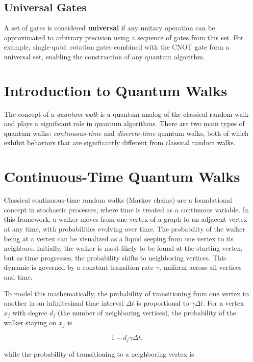 \documentclass[11pt]{article}
\theoremstyle{definition}
\begin{document}
\subsection*{Universal Gates}
A set of gates is considered \textbf{universal} if any unitary operation can be approximated to arbitrary precision using a sequence of gates from this set. For example, single-qubit rotation gates combined with the CNOT gate form a universal set, enabling the construction of any quantum algorithm.

\section{Introduction to Quantum Walks}


The concept of a \textit{quantum walk} is a quantum analog of the classical random walk and plays a significant role in quantum algorithms. There are two main types of quantum walks: \textit{continuous-time} and \textit{discrete-time} quantum walks, both of which exhibit behaviors that are significantly different from classical random walks.

\section*{Continuous-Time Quantum Walks}


Classical continuous-time random walks (Markov chains) are a foundational concept in stochastic processes, where time is treated as a continuous variable. In this framework, a walker moves from one vertex of a graph to an adjacent vertex at any time, with probabilities evolving over time. The probability of the walker being at a vertex can be visualized as a liquid seeping from one vertex to its neighbors. Initially, the walker is most likely to be found at the starting vertex, but as time progresses, the probability shifts to neighboring vertices. This dynamic is governed by a constant transition rate \( \gamma \), uniform across all vertices and time.

To model this mathematically, the probability of transitioning from one vertex to another in an infinitesimal time interval \( \Delta t \) is proportional to \( \gamma \Delta t \). For a vertex \( x_j \) with degree \( d_j \) (the number of neighboring vertices), the probability of the walker staying on \( x_j \) is 

\[
1 - d_j \gamma \Delta t,
\]

while the probability of transitioning to a neighboring vertex is 
\end{document}
